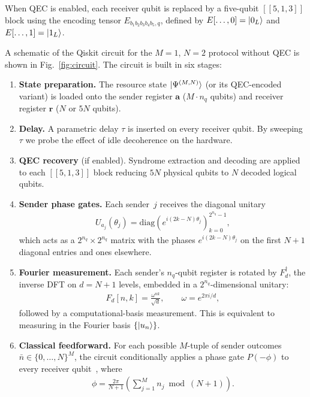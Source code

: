 When QEC is enabled, each receiver qubit is replaced by a five-qubit $[[5,1,3]]$ block using the encoding tensor $E_{b_1 b_2 b_3 b_4 b_5, q}$, defined by $E[\ldots,0] = \ket{0_L}$ and $E[\ldots,1] = \ket{1_L}$.

A schematic of the Qiskit circuit for the $M{=}1$, $N{=}2$ protocol without QEC is shown in Fig.~\ref{fig:circuit}. The circuit is built in six stages:

\begin{enumerate}
\item \textbf{State preparation.} The resource state $\ket{\Psi^{(M,N)}}$ (or its QEC-encoded variant) is loaded onto the sender register $\mathbf{a}$ ($M\cdot n_q$ qubits) and receiver register $\mathbf{r}$ ($N$ or $5N$ qubits).

\item \textbf{Delay.} A parametric delay $\tau$ is inserted on every receiver qubit. By sweeping $\tau$ we probe the effect of idle decoherence on the hardware.

\item \textbf{QEC recovery} (if enabled). Syndrome extraction and decoding are applied to each $[[5,1,3]]$ block reducing $5N$ physical qubits to $N$ decoded logical qubits.

\item \textbf{Sender phase gates.} Each sender~$j$ receives the diagonal unitary
\begin{align}
U_{a_j}(\theta_j) = \mathrm{diag}\!\left(e^{i(2k-N)\theta_j}\right)_{k=0}^{2^{n_q}-1},
\end{align}
which acts as a $2^{n_q}\times 2^{n_q}$ matrix with the phases $e^{i(2k-N)\theta_j}$ on the first $N{+}1$ diagonal entries and ones elsewhere.

\item \textbf{Fourier measurement.} Each sender's $n_q$-qubit register is rotated by $F_d^\dagger$, the inverse DFT on $d = N{+}1$ levels, embedded in a $2^{n_q}$-dimensional unitary:
\begin{align}
F_d[n,k] = \frac{\omega^{nk}}{\sqrt{d}},\qquad \omega = e^{2\pi i/d},
\end{align}
followed by a computational-basis measurement. This is equivalent to measuring in the Fourier basis $\{\ket{u_n}\}$.

\item \textbf{Classical feedforward.} For each possible $M$-tuple of sender outcomes $\bar{n}\in\{0,\dots,N\}^M$, the circuit conditionally applies a phase gate $P(-\phi)$ to every receiver qubit~\cite{corcoles2021dynamic}, where
\begin{align}
\phi = \frac{2\pi}{N+1}\!\left(\sum_{j=1}^{M} n_j \bmod (N{+}1)\right).
\end{align}

\end{enumerate}

